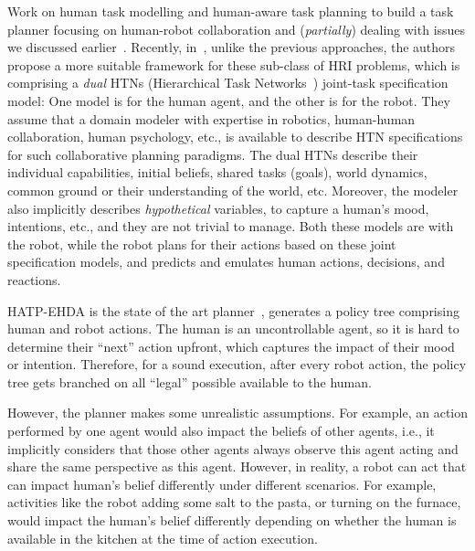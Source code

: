 \documentclass[letterpaper]{article} %
\begin{document}
Work on human task modelling and human-aware task planning to build a task planner focusing on human-robot collaboration and (\textit{partially}) dealing with issues we discussed earlier~\cite{alami2006toward,montreuil2007planning,alili2009planning,lallement2014hatp,de2015hatp,lallement2018hatp}.
Recently, in~\cite{BuisanA21,buisan:hal-03684211}, unlike the previous approaches, the authors propose a more suitable framework for these sub-class of HRI problems, which is comprising a \textit{dual} HTNs (Hierarchical Task Networks~\cite{naubooks0014222}) joint-task specification model: One model is for the human agent, and the other is for the robot. 
They assume that a domain modeler with expertise in robotics, human-human collaboration, human psychology, etc., is available to describe HTN specifications for such collaborative planning paradigms. 
The dual HTNs describe their individual capabilities, initial beliefs, shared tasks (goals), world dynamics, common ground or their understanding of the world, etc. Moreover, the modeler also implicitly describes \textit{hypothetical} variables, to capture a human's mood, intentions, etc., and they are not trivial to manage. 
Both these models are with the robot, while the robot plans for their actions based on these joint specification models, and predicts and emulates human actions, decisions, and reactions.    

HATP-EHDA is the state of the art planner~\cite{buisan:hal-03684211}, 
generates a policy tree comprising human and robot actions. 
The human is an uncontrollable agent,
so it is hard to determine their ``next'' action upfront, which captures the impact of their mood or intention.
Therefore, for a sound execution, after every robot action, the policy tree gets branched on all ``legal'' possible  available to the human.

However, the planner makes some unrealistic assumptions. For example, an action performed by one agent would also impact the beliefs of other agents, i.e., it implicitly considers that those other agents always observe this agent acting and share the same perspective as this agent. However, in reality, a robot can act that can impact human's belief differently under different scenarios. For example, activities like the robot adding some salt to the pasta, or turning on the furnace, would impact the human's belief differently depending on whether the human is available in the kitchen at the time of action execution.   
\end{document}
